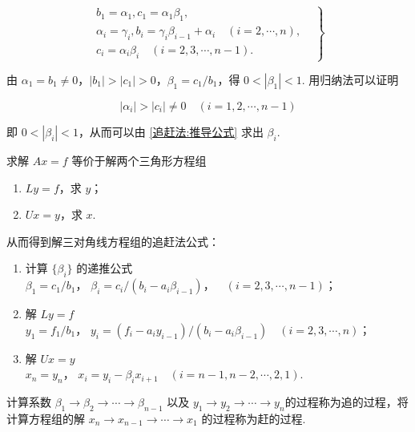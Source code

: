 \begin{equation}
    \left.\begin{aligned}
        b_1      = \alpha_1, c_1 = \alpha_1\beta_1,                                       & \\
        \alpha_i = \gamma_i, b_i = \gamma_i\beta_{i-1} + \alpha_i\quad(i = 2, \cdots, n), & \\
        c_i      = \alpha_i\beta_i\quad(i=2,3,\cdots,n-1).                                &
    \end{aligned}\right\}
    \label{追赶法:推导公式}
\end{equation}

由 $\alpha_1 = b_1 \neq 0$，$\left|b_1\right| > \left|c_1\right| > 0$，$\beta_1 = c_1 / b_1$，得 $0 < \left|\beta_1\right| < 1$. 用归纳法可以证明

\[ \left|\alpha_i\right| > \left|c_i\right| \neq 0\quad(i=1,2, \cdots, n - 1)\]

即 $0 < \left|\beta_i\right| < 1$，从而可以由 \eqref{追赶法:推导公式} 求出 $\beta_i$.

求解 $Ax=f$ 等价于解两个三角形方程组

\begin{enumerate}
    \item $Ly=f$，求 $y$；
    \item $Ux=y$，求 $x$.
\end{enumerate}

从而得到解三对角线方程组的追赶法公式：

\begin{enumerate}
    \item 计算 $\{\beta_i\}$ 的递推公式 \\
          $\beta_1 = c_1 / b_1$，
          $\beta_i = c_i / (b_i - a_i\beta_{i-1})$，$\quad(i=2,3,\cdots,n-1)$；
    \item 解 $Ly = f$ \\
          $y_1 = f_1 / b_1$，
          $y_i = (f_i - a_iy_{i-1}) / (b_i - a_i\beta_{i-1})\quad(i=2,3,\cdots,n)$；
    \item 解 $Ux = y$ \\
          $x_n = y_n$，
          $x_i = y_i - \beta_ix_{i+1}\quad(i=n-1,n-2,\cdots,2,1)$.
\end{enumerate}

计算系数 $\beta_1 \rightarrow \beta_2 \rightarrow \cdots \rightarrow \beta_{n-1}$ 以及 $y_1 \rightarrow y_2 \rightarrow \cdots \rightarrow y_n$的过程称为追的过程，将计算方程组的解 $x_n \rightarrow x_{n-1} \rightarrow \cdots \rightarrow x_1$ 的过程称为赶的过程.

